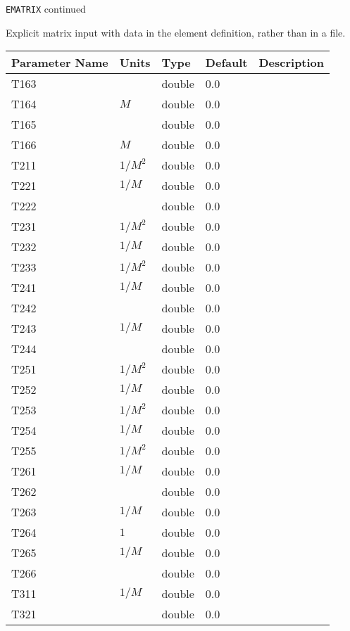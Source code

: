 \newpage
\begin{center}{\Large\verb|EMATRIX| continued}\end{center}
Explicit matrix input with data in the element definition, rather than in a file.
\\
\begin{tabular}{|l|l|l|l|p{\descwidth}|} \hline
Parameter Name & Units & Type & Default & Description \\ \hline 
T163 &  & double &  0.0 & \\ \hline 
T164 & $M$ & double &  0.0 & \\ \hline 
T165 &  & double &  0.0 & \\ \hline 
T166 & $M$ & double &  0.0 & \\ \hline 
T211 & $1/M^2$ & double &  0.0 & \\ \hline 
T221 & $1/M$ & double &  0.0 & \\ \hline 
T222 &  & double &  0.0 & \\ \hline 
T231 & $1/M^2$ & double &  0.0 & \\ \hline 
T232 & $1/M$ & double &  0.0 & \\ \hline 
T233 & $1/M^2$ & double &  0.0 & \\ \hline 
T241 & $1/M$ & double &  0.0 & \\ \hline 
T242 &  & double &  0.0 & \\ \hline 
T243 & $1/M$ & double &  0.0 & \\ \hline 
T244 &  & double &  0.0 & \\ \hline 
T251 & $1/M^2$ & double &  0.0 & \\ \hline 
T252 & $1/M$ & double &  0.0 & \\ \hline 
T253 & $1/M^2$ & double &  0.0 & \\ \hline 
T254 & $1/M$ & double &  0.0 & \\ \hline 
T255 & $1/M^2$ & double &  0.0 & \\ \hline 
T261 & $1/M$ & double &  0.0 & \\ \hline 
T262 &  & double &  0.0 & \\ \hline 
T263 & $1/M$ & double &  0.0 & \\ \hline 
T264 & $1$ & double &  0.0 & \\ \hline 
T265 & $1/M$ & double &  0.0 & \\ \hline 
T266 &  & double &  0.0 & \\ \hline 
T311 & $1/M$ & double &  0.0 & \\ \hline 
T321 &  & double &  0.0 & \\ \hline 

\end{tabular}
